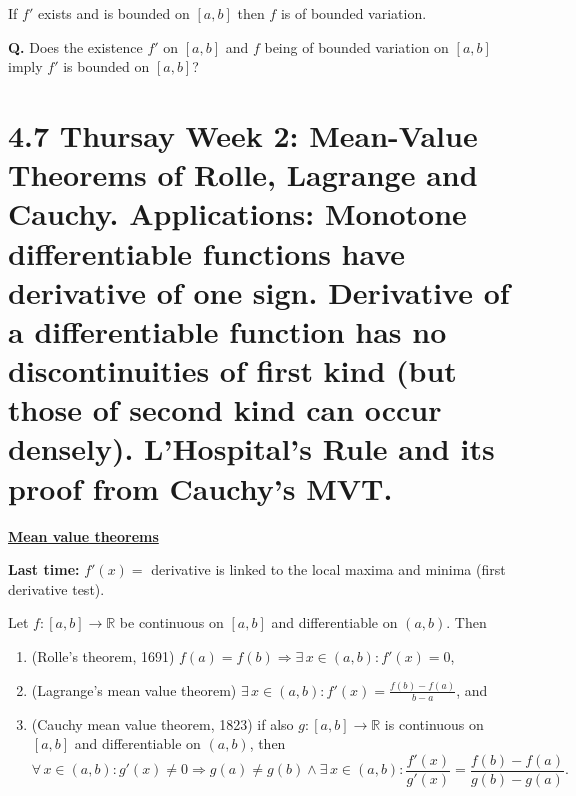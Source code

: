 \documentclass{notes}
\begin{document}
\begin{thm}
  If $f'$ exists and is bounded on $[a, b]$ then $f$ is of bounded variation.
\end{thm}

{\boldmath \bfseries Q.} Does the existence $f'$ on $[a, b]$ and $f$ being of bounded variation on $[a, b]$ imply $f'$ is bounded on $[a, b]$?

\fi

\newpage

\section{4.7 Thursay Week 2: Mean-Value Theorems of Rolle, Lagrange and Cauchy. Applications: Monotone differentiable functions have \texorpdfstring{\newline}{}derivative of one sign. Derivative of a differentiable function has no discontinuities of first kind (but those of second kind can occur densely). L'Hospital's Rule and its proof from Cauchy's MVT.}

{\boldmath \bfseries \underline{Mean value theorems}}

{\boldmath \bfseries Last time:} $f'(x) = $ derivative is linked to the local maxima and minima (first derivative test).

\begin{thm}
  Let $f \colon [a, b] \to \mathbb R$ be continuous on $[a, b]$ and differentiable on $(a, b)$.
  Then 
  \begin{enumerate}
    \item (Rolle's theorem, 1691) $f(a) = f(b) \Rightarrow \exists \, x \in (a, b): f'(x) = 0$, 

    \item (Lagrange's mean value theorem) $\exists \, x \in (a, b): f'(x) = \frac{f(b) - f(a)}{b - a}$, and 

    \item (Cauchy mean value theorem, 1823) if also $g \colon [a, b] \to \mathbb R$ is continuous on $[a, b]$ and differentiable on $(a, b)$, then 
    \[
      \forall \, x \in (a, b): g'(x) \neq 0 \Rightarrow g(a) \neq g(b) \land \exists \, x \in (a, b): \frac{f'(x)}{g'(x)} = \frac{f(b) - f(a)}{g(b) - g(a)}.
    \]
  \end{enumerate}
\end{thm}
\end{document}
